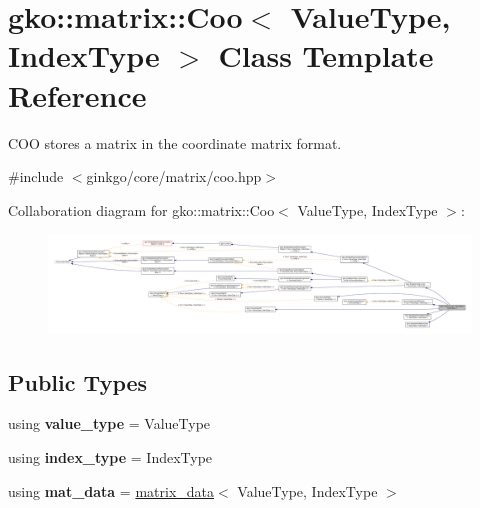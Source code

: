 \hypertarget{classgko_1_1matrix_1_1Coo}{}\section{gko\+:\+:matrix\+:\+:Coo$<$ Value\+Type, Index\+Type $>$ Class Template Reference}
\label{classgko_1_1matrix_1_1Coo}


C\+OO stores a matrix in the coordinate matrix format.  




{\ttfamily \#include $<$ginkgo/core/matrix/coo.\+hpp$>$}



Collaboration diagram for gko\+:\+:matrix\+:\+:Coo$<$ Value\+Type, Index\+Type $>$\+:
\nopagebreak
\begin{figure}[H]
\begin{center}
\leavevmode
\includegraphics[width=350pt]{classgko_1_1matrix_1_1Coo__coll__graph}
\end{center}
\end{figure}
\subsection*{Public Types}
\begin{DoxyCompactItemize}
\item 
\mbox{\label{classgko_1_1matrix_1_1Coo_a4e3cdd13b760cf4816aef0d176551e99}} 
using {\bfseries value\+\_\+type} = Value\+Type
\item 
\mbox{\label{classgko_1_1matrix_1_1Coo_ab7f7b99f477cfb086298104cf90105d2}} 
using {\bfseries index\+\_\+type} = Index\+Type
\item 
\mbox{\label{classgko_1_1matrix_1_1Coo_a52198fe6654bd0a2bec566a65bdc60ac}} 
using {\bfseries mat\+\_\+data} = \hyperlink{structgko_1_1matrix__data}{matrix\+\_\+data}$<$ Value\+Type, Index\+Type $>$
\end{DoxyCompactItemize}
